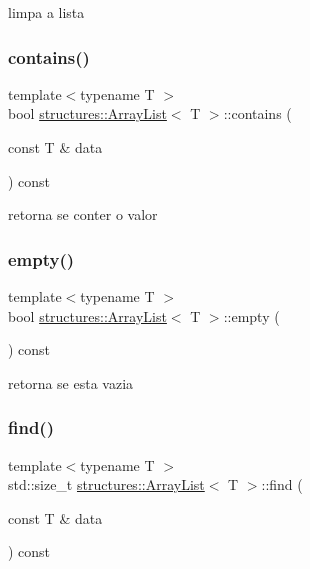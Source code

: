 limpa a lista 

\mbox{\label{classstructures_1_1ArrayList_ac8783a85dfd89c6e7e779b33ab475d71}} 
\subsubsection{\texorpdfstring{contains()}{contains()}}
{\footnotesize\ttfamily template$<$typename T $>$ \\
bool \mbox{\hyperlink{classstructures_1_1ArrayList}{structures\+::\+Array\+List}}$<$ T $>$\+::contains (\begin{DoxyParamCaption}\item[{const T \&}]{data }\end{DoxyParamCaption}) const}



retorna se conter o valor 

\mbox{\label{classstructures_1_1ArrayList_ae63920a127efd82e610e72b3ef5d681f}} 
\subsubsection{\texorpdfstring{empty()}{empty()}}
{\footnotesize\ttfamily template$<$typename T $>$ \\
bool \mbox{\hyperlink{classstructures_1_1ArrayList}{structures\+::\+Array\+List}}$<$ T $>$\+::empty (\begin{DoxyParamCaption}{ }\end{DoxyParamCaption}) const}



retorna se esta vazia 

\mbox{\label{classstructures_1_1ArrayList_a00be80d3ae698b91d485507f44d82e84}} 
\subsubsection{\texorpdfstring{find()}{find()}}
{\footnotesize\ttfamily template$<$typename T $>$ \\
std\+::size\+\_\+t \mbox{\hyperlink{classstructures_1_1ArrayList}{structures\+::\+Array\+List}}$<$ T $>$\+::find (\begin{DoxyParamCaption}\item[{const T \&}]{data }\end{DoxyParamCaption}) const}



